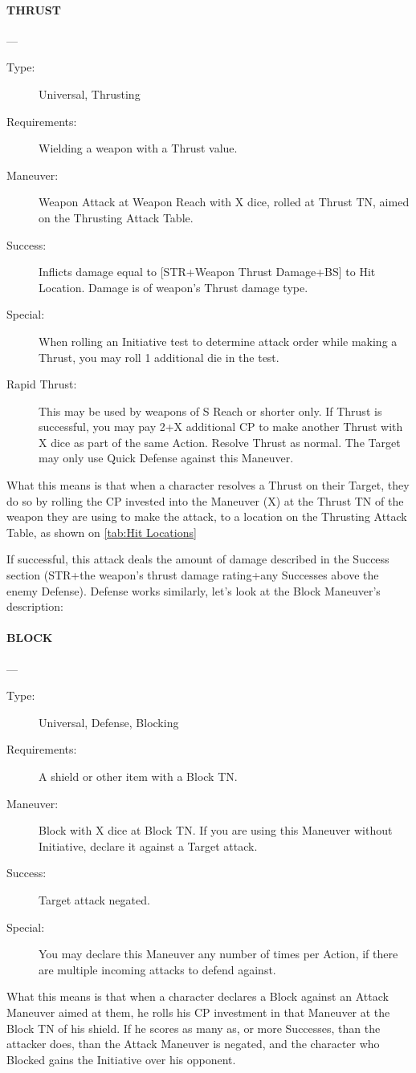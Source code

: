 \documentclass[oneside,11pt,english]{book}
\begin{document}
\paragraph{\large THRUST}---\quad{\large[X]}
\begin{description}
\item [Type:] Universal, Thrusting
\item [Requirements:] Wielding a weapon with a Thrust value.
\item [Maneuver:] Weapon Attack at Weapon Reach with X dice, rolled at Thrust TN, aimed on the Thrusting Attack Table.
\item [Success:] Inflicts damage equal to [STR+Weapon Thrust Damage+BS] to Hit Location. Damage is of weapon’s Thrust damage type.
\item [Special:] When rolling an Initiative test to determine attack order while making a Thrust, you may roll 1 additional die in the test.
\item [Rapid Thrust:] This may be used by weapons of S Reach or shorter only. If Thrust is successful, you may pay 2+X additional CP to make another Thrust with X dice as part of the same Action. Resolve Thrust as normal. The Target may only use Quick Defense against this Maneuver.
\end{description}

What this means is that when a character resolves a Thrust on their Target, they do so by rolling the CP invested into the Maneuver (X) at the Thrust TN of the weapon they are using to make the attack, to a location on the Thrusting Attack Table, as shown on \autoref{tab:Hit Locations} 

If successful, this attack deals the amount of damage described in the Success section (STR+the weapon’s thrust damage rating+any Successes above the enemy Defense).
Defense works similarly, let’s look at the Block Maneuver’s description:

\paragraph{\large BLOCK}---\quad{\large[X]}
\begin{description}
\item [Type:] Universal, Defense, Blocking
\item [Requirements:] A shield or other item with a Block TN.
\item [Maneuver:] Block with X dice at Block TN. If you are using this Maneuver without Initiative, declare it against a Target attack.
\item [Success:] Target attack negated.
\item [Special:] You may declare this Maneuver any number of times per Action, if there are multiple incoming attacks to defend against.
\end{description}
What this means is that when a character declares a Block against an Attack Maneuver aimed at them, he rolls his CP investment in that Maneuver at the Block TN of his shield. If he scores as many as, or more Successes, than the attacker does, than the Attack Maneuver is negated, and the character who Blocked gains the Initiative over his opponent.
\end{document}
